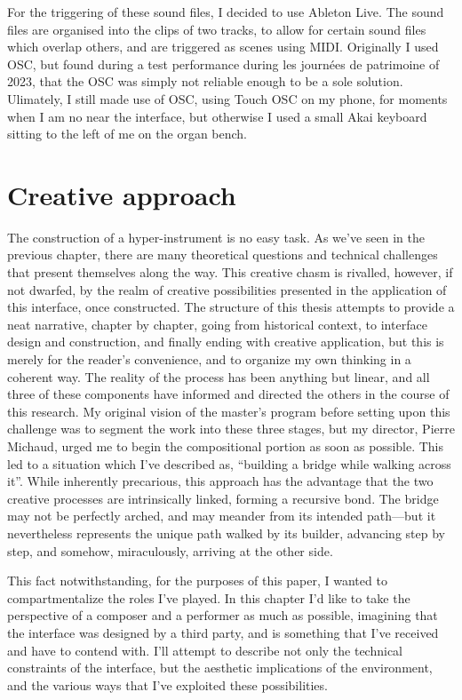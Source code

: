 \documentclass[12pt,twoside,maitrise]{dms_ks}
\theoremstyle{definition}
\begin{document}
For the triggering of these sound files, I decided to use Ableton Live. 
The sound files are organised into the clips of two tracks, to allow for certain sound files which overlap others, and are triggered as scenes using MIDI. 
Originally I used OSC, but found during a test performance during les journées de patrimoine of 2023, that the OSC was simply not reliable enough to be a sole solution. 
Ulimately, I still made use of OSC, using Touch OSC on my phone, for moments when I am no near the interface, but otherwise I used a small Akai keyboard sitting to the left of me on the organ bench.

\chapter{Creative approach}

The construction of a hyper-instrument is no easy task.
As we've seen in the previous chapter, there are many theoretical questions and technical challenges that present themselves along the way.
This creative chasm is rivalled, however, if not dwarfed, by the realm of creative possibilities presented in the application of this interface, once constructed.
The structure of this thesis attempts to provide a neat narrative, chapter by chapter, going from historical context, to interface design and construction, and finally ending with creative application, but this is merely for the reader's convenience, and to organize my own thinking in a coherent way.
The reality of the process has been anything but linear, and all three of these components have informed and directed the others in the course of this research.
My original vision of the master’s program before setting upon this challenge was to segment the work into these three stages, but my director, Pierre Michaud, urged me to begin the compositional portion as soon as possible.
This led to a situation which I’ve described as, “building a bridge while walking across it”.
While inherently precarious, this approach has the advantage that the two creative processes are intrinsically linked, forming a recursive bond.
The bridge may not be perfectly arched, and may meander from its intended path—but it nevertheless represents the unique path walked by its builder, advancing step by step, and somehow, miraculously, arriving at the other side.

This fact notwithstanding, for the purposes of this paper, I wanted to compartmentalize the roles I’ve played.
In this chapter I’d like to take the perspective of a composer and a performer as much as possible, imagining that the interface was designed by a third party, and is something that I’ve received and have to contend with.
I’ll attempt to describe not only the technical constraints of the interface, but the aesthetic implications of the environment, and the various ways that I’ve exploited these possibilities.
\end{document}

